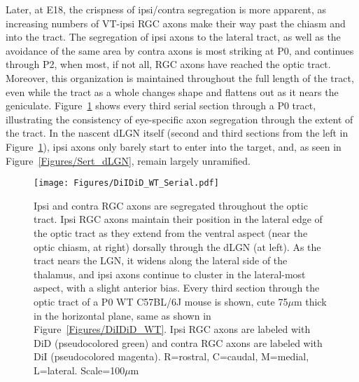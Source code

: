 Later, at E18, the crispness of ipsi/contra segregation is more apparent, as increasing numbers of VT-ipsi RGC axons make their way past the chiasm and into the tract.
The segregation of ipsi axons to the lateral tract, as well as the avoidance of the same area by contra axons is most striking at P0, and continues through P2, when most, if not all, RGC axons have reached the optic tract.
Moreover, this organization is maintained throughout the full length of the tract, even while the tract as a whole changes shape and flattens out as it nears the geniculate.
Figure~\ref{Figures/DiIDiD_WT_Serial} shows every third serial section through a P0 tract, illustrating the consistency of eye-specific axon segregation through the extent of the tract.
In the nascent dLGN itself (second and third sections from the left in Figure~\ref{Figures/DiIDiD_WT_Serial}), ipsi axons only barely start to enter into the target, and, as seen in Figure~\ref{Figures/Sert_dLGN}, remain largely unramified.

\begin{figure}[hbtp]
    \begin{center}
        \texttt{[image: Figures/DiIDiD\_WT\_Serial.pdf]}
        \caption[Ipsi and contra RGC axons are segregated throughout the optic tract.]
        {Ipsi and contra RGC axons are segregated throughout the optic tract.
        Ipsi RGC axons maintain their position in the lateral edge of the optic tract as they extend from the ventral aspect (near the optic chiasm, at right) dorsally through the dLGN (at left).
        As the tract nears the LGN, it widens along the lateral side of the thalamus, and ipsi axons continue to cluster in the lateral-most aspect, with a slight anterior bias.
        Every third section through the optic tract of a P0 WT C57BL/6J mouse is shown, cute 75$\mu$m thick in the horizontal plane, same as shown in Figure~\ref{Figures/DiIDiD_WT}.
        Ipsi RGC axons are labeled with DiD (pseudocolored green) and contra RGC axons are labeled with DiI (pseudocolored magenta).
        R=rostral, C=caudal, M=medial, L=lateral. Scale=100$\mu$m}
        \label{Figures/DiIDiD_WT_Serial}
    \end{center}
\end{figure}

